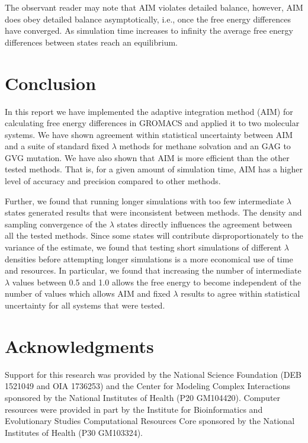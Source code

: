 The observant reader may note that AIM violates detailed balance, however, AIM does obey detailed balance asymptotically, i.e., once the free energy differences have converged. As simulation time increases to infinity the average free energy differences between states reach an equilibrium. 

\section{Conclusion}

In this report we have implemented the adaptive integration method (AIM) for calculating free energy differences in GROMACS and applied it to two molecular systems. We have shown agreement within statistical uncertainty between AIM and a suite of standard fixed $\lambda$ methods for methane solvation and an GAG to GVG mutation. We have also shown that AIM is more efficient than the other tested methods. That is, for a given amount of simulation time, AIM has a higher level of accuracy and precision compared to other methods.

Further, we found that running longer simulations with too few intermediate $\lambda$ states generated results that were inconsistent between methods. The density and sampling convergence of the $\lambda$ states directly influences the agreement between all the tested methods. Since some states will contribute disproportionately to the variance of the estimate, we found that testing short simulations of different $\lambda$ densities before attempting longer simulations is a more economical use of time and resources. In particular, we found that increasing the number of intermediate $\lambda$ values between 0.5 and 1.0 allows the free energy to become independent of the number of values which allows AIM and fixed $\lambda$ results to agree within statistical uncertainty for all systems that were tested.

\section{Acknowledgments}
Support for this research was provided by the National Science Foundation (DEB 1521049 and OIA 1736253) and the Center for Modeling Complex Interactions sponsored by the National Institutes of Health (P20 GM104420). Computer resources were provided in part by the Institute for Bioinformatics and Evolutionary Studies Computational Resources Core sponsored by the National Institutes of Health (P30 GM103324).


